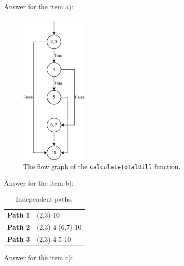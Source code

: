 \begin{solution}
    Answer for the item a):
    \begin{figure}[H]
        \centering
        \includegraphics[width=0.3\textwidth]{images/exercise-6a-solution.png}
        \caption{The flow graph of the \lstinline!calculateTotalBill! function.}
        \label{fig:ex6-fg}
    \end{figure}

    Answer for the item b):
    \begin{table}[H]
        \centering
        \renewcommand{\arraystretch}{1.2}
        \caption{Independent paths.}
        \label{tab:ex3-indep-paths}
        \begin{tabular}{p{}p{}}
            \toprule
            \textbf{Path 1} & (2,3)-10\\
            \textbf{Path 2} & (2,3)-4-(6,7)-10\\
            \textbf{Path 3} & (2,3)-4-5-10\\
            \bottomrule
        \end{tabular}
    \end{table}
    
    Answer for the item c):
    

\end{solution}
